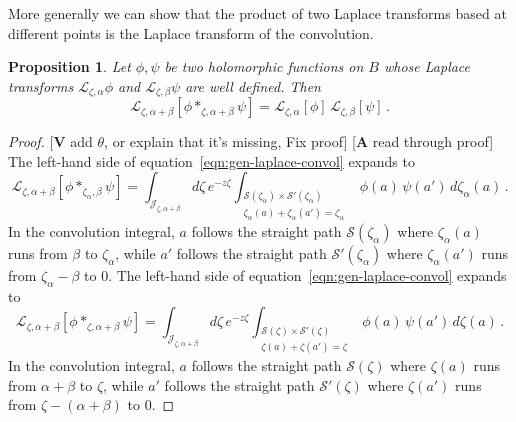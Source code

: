 \documentclass{article}
\newcommand{\laplace}{\mathcal{L}}
\theoremstyle{definition}
\theoremstyle{plain}
\newtheorem{prop}[definition]{Proposition}
\newenvironment{todo}{\color{Coral}}{\color{black}}
\newenvironment{draft}{\color{SlateBlue}}{\color{black}}
\newenvironment{revised}{\color{DarkBlue}}{\color{black}}
\newenvironment{revised}{}{}
\begin{document}
More generally we can show that the product of two Laplace transforms based at different points is the Laplace transform of the convolution.
\begin{prop}
Let $\phi,\psi$ be two holomorphic functions on $B$ whose Laplace transforms $\laplace_{\zeta,\alpha}\phi$ and $\laplace_{\zeta,\beta}\psi$ are well defined. Then 
\begin{equation}\label{eqn:gen-laplace-convol}
\laplace_{\zeta,\alpha+\beta}[\phi \ast_{\zeta,\alpha+\beta} \psi] = \laplace_{\zeta,\alpha}[\phi]\,\laplace_{\zeta,\beta}[\psi]\,.
\end{equation}    
\end{prop}
\begin{proof}
\begin{todo}
[\textbf{V} add $\theta$, or explain that it's missing, Fix proof] [\textbf{A} read through proof]
\end{todo}
\begin{revised}
The left-hand side of equation~\eqref{eqn:gen-laplace-convol} expands to
\[ \laplace_{\zeta,\alpha+\beta}[\phi \ast_{\zeta_\alpha, \beta} \psi] = \int_{\mathcal{J}_{\zeta, \alpha+\beta}} d\zeta\,e^{-z\zeta}\int_{\substack{\mathcal{S}(\zeta_\alpha) \times \mathcal{S}'(\zeta_\alpha) \\ \zeta_\alpha(a) + \zeta_\alpha(a') = \zeta_\alpha}}  \phi(a)\,\psi(a')\, d\zeta_\alpha(a)\,. \]
In the convolution integral, $a$ follows the straight path $\mathcal{S}(\zeta_\alpha)$ where $\zeta_\alpha(a)$ runs from $\beta$ to $\zeta_\alpha$, while $a'$ follows the straight path $\mathcal{S}'(\zeta_\alpha)$ where $\zeta_\alpha(a')$ runs from $\zeta_\alpha - \beta$ to $0$.
\end{revised}
\begin{draft}
The left-hand side of equation~\eqref{eqn:gen-laplace-convol} expands to
\[ \laplace_{\zeta,\alpha+\beta}[{\phi}\ast_{\zeta, \alpha+\beta}{\psi}] = \int_{\mathcal{J}_{\zeta, \alpha+\beta}} d\zeta\,e^{-z\zeta}\int_{\substack{\mathcal{S}(\zeta) \times \mathcal{S}'(\zeta) \\ \zeta(a) + \zeta(a') = \zeta}}  \phi(a)\,\psi(a')\, d\zeta(a)\,. \]
In the convolution integral, $a$ follows the straight path $\mathcal{S}(\zeta)$ where $\zeta(a)$ runs from $\alpha+\beta$ to $\zeta$, while $a'$ follows the straight path $\mathcal{S}'(\zeta)$ where $\zeta(a')$ runs from $\zeta - (\alpha + \beta)$ to $0$.


\end{draft}
\end{proof}
\end{document}
